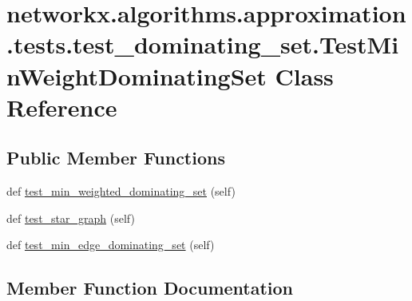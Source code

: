 \hypertarget{classnetworkx_1_1algorithms_1_1approximation_1_1tests_1_1test__dominating__set_1_1TestMinWeightDominatingSet}{}\section{networkx.\+algorithms.\+approximation.\+tests.\+test\+\_\+dominating\+\_\+set.\+Test\+Min\+Weight\+Dominating\+Set Class Reference}
\label{classnetworkx_1_1algorithms_1_1approximation_1_1tests_1_1test__dominating__set_1_1TestMinWeightDominatingSet}
\subsection*{Public Member Functions}
\begin{DoxyCompactItemize}
\item 
def \hyperlink{classnetworkx_1_1algorithms_1_1approximation_1_1tests_1_1test__dominating__set_1_1TestMinWeightDominatingSet_ae2cd0929cae0da6ab2afed2d9aa025b4}{test\+\_\+min\+\_\+weighted\+\_\+dominating\+\_\+set} (self)
\item 
def \hyperlink{classnetworkx_1_1algorithms_1_1approximation_1_1tests_1_1test__dominating__set_1_1TestMinWeightDominatingSet_a6a30195820974e1486d1d3c8666ff5f1}{test\+\_\+star\+\_\+graph} (self)
\item 
def \hyperlink{classnetworkx_1_1algorithms_1_1approximation_1_1tests_1_1test__dominating__set_1_1TestMinWeightDominatingSet_a9bcb879b989029a436ec8388c8fa55f8}{test\+\_\+min\+\_\+edge\+\_\+dominating\+\_\+set} (self)
\end{DoxyCompactItemize}


\subsection{Member Function Documentation}
\mbox{\label{classnetworkx_1_1algorithms_1_1approximation_1_1tests_1_1test__dominating__set_1_1TestMinWeightDominatingSet_a9bcb879b989029a436ec8388c8fa55f8}} 
